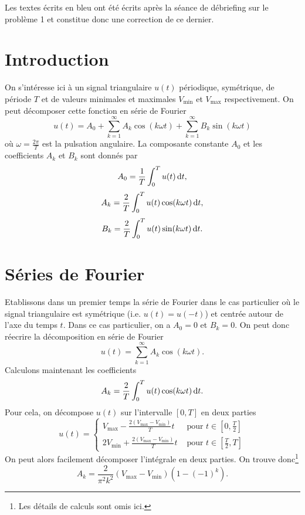 

\begin{correction}
	Les textes écrits en bleu ont été écrits après
	la séance de débriefing sur le problème 1 et
	constitue donc une correction de ce dernier.
\end{correction}

\section{Introduction}
On s'intéresse ici à un signal triangulaire $u(t)$
périodique, symétrique, de période $T$ et de valeurs 
minimales et maximales $V_{\text{min}}$ et $V_{\text{max}}$
respectivement. On peut décomposer cette fonction
en série de Fourier
\begin{equation}
	u(t) = A_0 + \sum_{k=1}^{\infty} A_k\cos(k\omega t)
	+ \sum_{k=1}^{\infty} B_k\sin(k\omega t)
	\label{eq:fourier-real}
\end{equation}
où $\omega = \frac{2\pi}{T}$ est la pulsation angulaire.
La composante constante $A_0$ et les coefficients $A_k$
et $B_k$ sont donnés par 
\begin{equation} 
	A_0 = \frac{1}{T} \int_0^T u(t)\operatorname{d}\! t,
	\label{eq:fourier-constant}
\end{equation}
\begin{equation}
	A_k = \frac{2}{T} \int_0^T u(t)\cos(k\omega t)\operatorname{d}\! t,
	\label{eq:fourier-coef-cos}
\end{equation}
\begin{equation}
	B_k = \frac{2}{T} \int_0^T u(t)\sin(k\omega t)\operatorname{d}\! t.
	\label{eq:fourier-coef-sin}
\end{equation}

\section{Séries de Fourier}
Etablissons dans un premier temps la série de Fourier
dans le cas particulier où le signal triangulaire
est symétrique (i.e. $u(t) = u(-t)$) et centrée autour
de l'axe du temps $t$. Dans ce cas particulier, on a $A_0 = 0$
et $B_k = 0$. On peut donc réecrire la décomposition
en série de Fourier 
\[ u(t) = \sum_{k=1}^{\infty} A_k\cos(k\omega t).\]
Calculons maintenant les coefficients
\[ A_k = \frac{2}{T} \int_0^T u(t)\cos(k\omega t)\operatorname{d}\! t.\]
Pour cela, on décompose $u(t)$ sur l'intervalle $[0,T]$
en deux parties
\[ u(t) =
	\left\{
		\begin{array}{rl}
			V_{\text{max}} - \frac{2(V_{\text{max}}-V_{\text{min}})}{T}t 	
			&\text{ pour } t \in [0,\frac{T}{2}]  \\
			2V_{\text{min}} + \frac{2(V_{\text{max}}-V_{\text{min}})}{T}t 
			&\text{ pour }t \in [\frac{T}{2},T] 
		\end{array}
	\right.
\]
On peut alors facilement décomposer l'intégrale en deux
parties. On trouve donc\footnote{Les détails
de calculs sont omis ici.}
\[ A_k = \frac{2}{\pi^2k^2}(V_{\text{max}}-V_{\text{min}})
(1 - (-1)^k).\]


